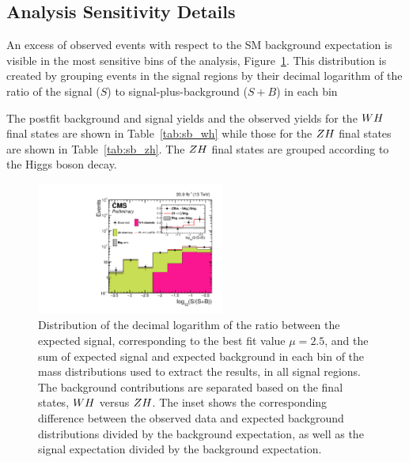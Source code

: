 \subsection{Analysis Sensitivity Details}
An excess of observed events with respect to the SM background expectation is 
visible in the most sensitive bins of the analysis, Figure~\ref{fig:sb}.
This distribution is created by grouping events in the signal regions 
by their decimal logarithm of the ratio of the 
signal ($S$) to signal-plus-background ($S+B$) in each bin

The postfit background and signal yields and the observed yields for the
$WH$ final states are shown in Table~\ref{tab:sb_wh} while those
for the $ZH$ final states are shown in Table~\ref{tab:sb_zh}. 
The $ZH$ final states are grouped according to the Higgs boson decay.

\begin{figure}[!ht]
 \begin{center}
  \includegraphics[width=0.55\textwidth]{higgs_to_taus_vh/plots/combined/wh_vs_zh_sbweight.pdf}
 \end{center}
 \caption{
 Distribution of the decimal logarithm of the ratio between the expected signal, 
 corresponding to the best fit value $\mu=2.5$, and the 
 sum of expected signal and expected background in each bin of the mass distributions 
 used to extract the results, in all signal regions. The background contributions are 
 separated based on the final states, $WH$ versus $ZH$. The inset 
 shows the corresponding difference between the 
 observed data and expected background distributions divided by the background expectation, 
 as well as the signal expectation divided by the background expectation.
 }
 \label{fig:sb}
\end{figure}

